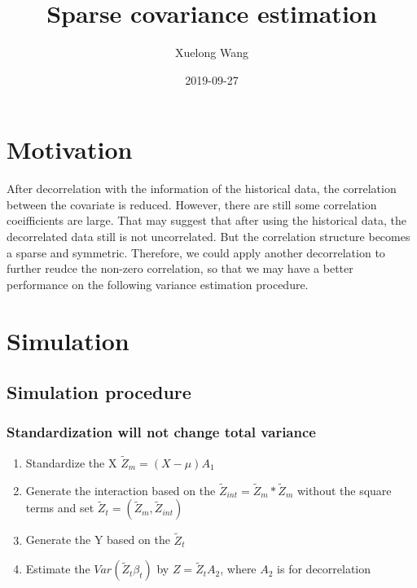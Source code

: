 \documentclass[]{article}
\title{Sparse covariance estimation}
\author{Xuelong Wang}
\date{2019-09-27}
\providecommand{\tightlist}{%
  \setlength{\itemsep}{0pt}\setlength{\parskip}{0pt}}
\begin{document}
\maketitle

{
\setcounter{tocdepth}{2}
\tableofcontents
}
\section{Motivation}\label{motivation}

After decorrelation with the information of the historical data, the
correlation between the covariate is reduced. However, there are still
some correlation coeifficients are large. That may suggest that after
using the historical data, the decorrelated data still is not
uncorrelated. But the correlation structure becomes a sparse and
symmetric. Therefore, we could apply another decorrelation to further
reudce the non-zero correlation, so that we may have a better
performance on the following variance estimation procedure.

\section{Simulation}\label{simulation}

\subsection{Simulation procedure}\label{simulation-procedure}

\subsubsection{Standardization will not change total
variance}\label{standardization-will-not-change-total-variance}

\begin{enumerate}
\def\labelenumi{\arabic{enumi}.}
\tightlist
\item
  Standardize the X \(\tilde{Z}_m = (X-\mu)A_1\)
\item
  Generate the interaction based on the
  \(\tilde{Z}_{int} = \tilde{Z}_m*\tilde{Z}_m\) without the square terms
  and set \(\tilde{Z}_t = (\tilde{Z}_m, \tilde{Z}_{int})\)
\item
  Generate the Y based on the \(\tilde{Z}_t\)
\item
  Estimate the \(Var(\tilde{Z}_t \beta_t)\) by \(Z = \tilde{Z}_tA_2\),
  where \(A_2\) is for decorrelation
\end{enumerate}
\end{document}
